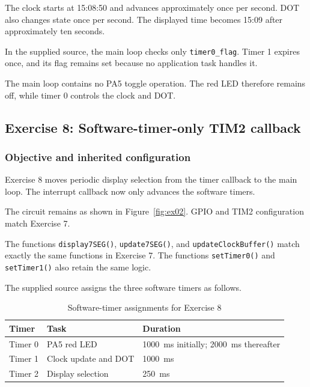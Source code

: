 \documentclass[a4paper]{article}
\begin{document}
The clock starts at 15:08:50 and advances
approximately once per second. DOT also
changes state once per second.
The displayed time becomes 15:09 after
approximately ten seconds.

In the supplied source, the main loop checks
only \texttt{timer0\_flag}.
Timer 1 expires once, and its flag remains
set because no application task handles it.

The main loop contains no PA5 toggle operation.
The red LED therefore remains off, while
timer 0 controls the clock and DOT.
\subsection{Exercise 8: Software-timer-only TIM2 callback}

\subsubsection{Objective and inherited configuration}

Exercise 8 moves periodic display selection
from the timer callback to the main loop.
The interrupt callback now only advances
the software timers.

The circuit remains as shown in Figure~\ref{fig:ex02}.
GPIO and TIM2 configuration match Exercise 7.

The functions \texttt{display7SEG()},
\texttt{update7SEG()}, and
\texttt{updateClockBuffer()} match exactly
the same functions in Exercise 7.
The functions \texttt{setTimer0()} and
\texttt{setTimer1()} also retain the same logic.

The supplied source assigns the three software
timers as follows.

\begin{table}[H]
    \centering
    \caption{Software-timer assignments for Exercise 8}
    \label{tab:ex08-timers}
    \begin{tabular}{
        p{}
        p{}
        p{}}
        \toprule
        \textbf{Timer} &
        \textbf{Task} &
        \textbf{Duration} \\
        \midrule
        Timer 0 & PA5 red LED &
        1000~ms initially; 2000~ms thereafter \\
        Timer 1 & Clock update and DOT &
        1000~ms \\
        Timer 2 & Display selection &
        250~ms \\
        \bottomrule
    \end{tabular}
\end{table}
\end{document}
